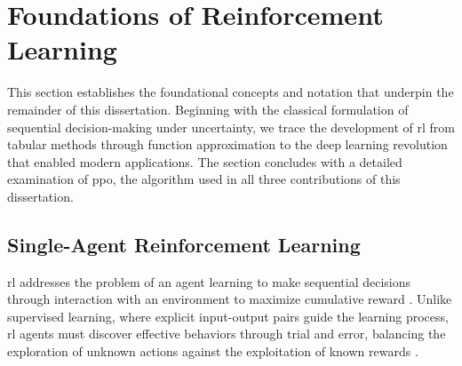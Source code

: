 
\section{Foundations of Reinforcement Learning}
\label{sec:foundations}

This section establishes the foundational concepts and notation that 
underpin the remainder of this dissertation. Beginning with the classical 
formulation of sequential decision-making under uncertainty, we trace 
the development of \gls{rl} from tabular methods through function 
approximation to the deep learning revolution that enabled modern applications. 
The section concludes with a detailed examination of \gls{ppo}, 
the algorithm used in all three contributions of this dissertation.

\subsection{Single-Agent Reinforcement Learning}
\label{sec:single-agent-rl}

\Gls{rl} addresses the problem of an agent learning to make sequential decisions 
through interaction with an environment to maximize cumulative reward \cite{sutton2018}. 
Unlike supervised learning, where explicit input-output pairs guide the learning process, 
\gls{rl} agents must discover effective behaviors through trial and error, 
balancing the exploration of unknown actions against the exploitation of 
known rewards \cite{kaelbling1996}.

